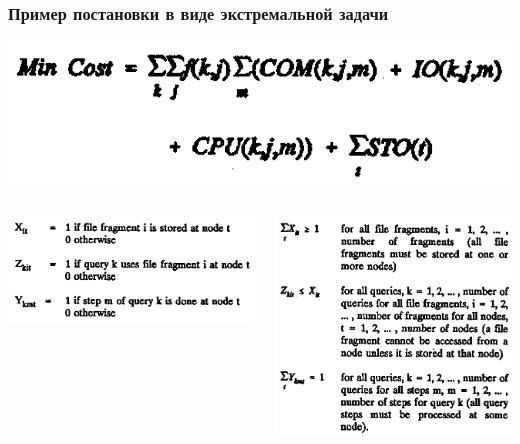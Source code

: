\documentclass[unicode]{beamer}
\begin{document}
\begin{frame}
\frametitle{Пример постановки в виде экстремальной задачи \cite{p9}}
\includegraphics[scale=0.6]{CostExample-function.png}
\begin{columns}[c] %


\includegraphics[scale=0.5]{CostExample-variables.png}

\includegraphics[scale=0.5]{CostExample-constraints.png}
\end{columns}



\end{frame}
\end{document}
